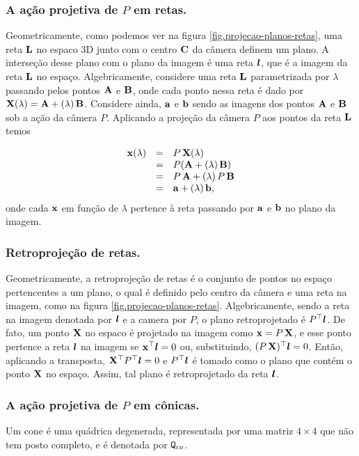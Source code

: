 \subsubsection{A ação projetiva de $P$ em retas.}\label{sec.proj.retas}
Geometricamente, como podemos ver na figura \ref{fig.projecao-planos-retas}, uma reta ${\bf L}$ no espaco 3D junto com o centro ${\bf C}$ da câmera definem um plano. A interseção desse plano com o plano da imagem é uma reta $\boldsymbol{l}$, que é a imagem da reta ${\bf L}$ no espaço. Algebricamente, considere uma reta ${\bf L}$ parametrizada por $\lambda$ passando pelos pontos ${\bf A}$ e ${\bf B}$, onde cada ponto nessa reta é dado por $\mathbf{X}(\lambda)={\bf A}+(\lambda)\,{\bf B}$. Considere ainda, ${\bf a}$ e ${\bf b}$ sendo as imagens dos pontos ${\bf A}$ e ${\bf B}$ sob a ação da câmera $P$. Aplicando a projeção da câmera $P$ aos pontos da reta ${\bf L}$ temos

\begin{equation*}
\begin{array}{rcl}
\mathbf{x}(\lambda)&=&P\,\mathbf{X}(\lambda)\\
&=&P({\bf A}+(\lambda)\,{\bf B})\\
&=&P\,{\bf A}+(\lambda)\,P\,{\bf B}\\
&=&{\bf a}+(\lambda)\,{\bf b},
\end{array}
\end{equation*}
onde cada $\mathbf{x}$ em função de $\lambda$ pertence à reta passando por ${\bf a}$ e ${\bf b}$ no plano da imagem.  

\subsubsection*{Retroprojeção de retas.}
Geometricamente, a retroprojeção de retas é o conjunto de pontos no espaço pertencentes a um plano, o qual é definido pelo centro da câmera e uma reta na imagem, como na figura \ref{fig.projecao-planos-retas}. Algebricamente, sendo a reta na imagem denotada por $\boldsymbol{l}$ e a camera por $P$, o plano retroprojetado é $P^\top\boldsymbol{l}$. De fato, um ponto $\mathbf{X}$ no espaco é projetado na imagem como $\mathbf{x}=P\,\mathbf{X}$, e esse ponto pertence a reta $\boldsymbol{l}$ na imagem se $\mathbf{x}^\top\boldsymbol{l}=0$ ou, substituindo, $(P\,\mathbf{X})^\top\boldsymbol{l}=0$. Então, aplicando a transposta, $\mathbf{X}^\top P^\top\boldsymbol{l}=0$ e $P^\top\boldsymbol{l}$ é tomado como o plano que contém o ponto $\mathbf{X}$ no espaço. Assim, tal plano é retroprojetado da reta $\boldsymbol{l}$.  

\subsubsection{A ação projetiva de $P$ em cônicas.}
Um cone é uma quádrica degenerada, representada por uma matriz $4\times4$ que não tem posto completo, e é denotada por ${\tt Q}_{co}$.

